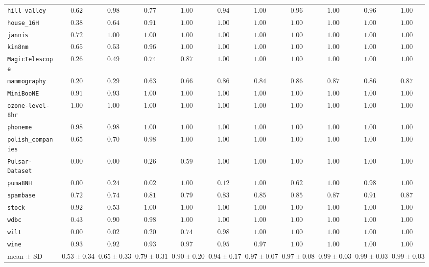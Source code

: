 {\begin{tabular}{@{}lcccccccccc@{}}
\texttt{hill-valley} & $0.62$ & $0.98$ & $0.77$ & $1.00$ & $0.94$ & $1.00$ & $0.96$ & $1.00$ & $0.96$ & $1.00$ \\
\texttt{house\_16H} & $0.38$ & $0.64$ & $0.91$ & $1.00$ & $1.00$ & $1.00$ & $1.00$ & $1.00$ & $1.00$ & $1.00$ \\
\texttt{jannis} & $0.72$ & $1.00$ & $1.00$ & $1.00$ & $1.00$ & $1.00$ & $1.00$ & $1.00$ & $1.00$ & $1.00$ \\
\texttt{kin8nm} & $0.65$ & $0.53$ & $0.96$ & $1.00$ & $1.00$ & $1.00$ & $1.00$ & $1.00$ & $1.00$ & $1.00$ \\
\texttt{MagicTelescope} & $0.26$ & $0.49$ & $0.74$ & $0.87$ & $1.00$ & $1.00$ & $1.00$ & $1.00$ & $1.00$ & $1.00$ \\
\texttt{mammography} & $0.20$ & $0.29$ & $0.63$ & $0.66$ & $0.86$ & $0.84$ & $0.86$ & $0.87$ & $0.86$ & $0.87$ \\
\texttt{MiniBooNE} & $0.91$ & $0.93$ & $1.00$ & $1.00$ & $1.00$ & $1.00$ & $1.00$ & $1.00$ & $1.00$ & $1.00$ \\
\texttt{ozone-level-8hr} & $1.00$ & $1.00$ & $1.00$ & $1.00$ & $1.00$ & $1.00$ & $1.00$ & $1.00$ & $1.00$ & $1.00$ \\
\texttt{phoneme} & $0.98$ & $0.98$ & $1.00$ & $1.00$ & $1.00$ & $1.00$ & $1.00$ & $1.00$ & $1.00$ & $1.00$ \\
\texttt{polish\_companies} & $0.65$ & $0.70$ & $0.98$ & $1.00$ & $1.00$ & $1.00$ & $1.00$ & $1.00$ & $1.00$ & $1.00$ \\
\texttt{Pulsar-Dataset} & $0.00$ & $0.00$ & $0.26$ & $0.59$ & $1.00$ & $1.00$ & $1.00$ & $1.00$ & $1.00$ & $1.00$ \\
\texttt{puma8NH} & $0.00$ & $0.24$ & $0.02$ & $1.00$ & $0.12$ & $1.00$ & $0.62$ & $1.00$ & $0.98$ & $1.00$ \\
\texttt{spambase} & $0.72$ & $0.74$ & $0.81$ & $0.79$ & $0.83$ & $0.85$ & $0.85$ & $0.87$ & $0.91$ & $0.87$ \\
\texttt{stock} & $0.92$ & $0.53$ & $1.00$ & $1.00$ & $1.00$ & $1.00$ & $1.00$ & $1.00$ & $1.00$ & $1.00$ \\
\texttt{wdbc} & $0.43$ & $0.90$ & $0.98$ & $1.00$ & $1.00$ & $1.00$ & $1.00$ & $1.00$ & $1.00$ & $1.00$ \\
\texttt{wilt} & $0.00$ & $0.02$ & $0.20$ & $0.74$ & $0.98$ & $1.00$ & $1.00$ & $1.00$ & $1.00$ & $1.00$ \\
\texttt{wine} & $0.93$ & $0.92$ & $0.93$ & $0.97$ & $0.95$ & $0.97$ & $1.00$ & $1.00$ & $1.00$ & $1.00$ \\
\midrule mean $\pm$ SD & $0.53 \pm 0.34$ & $0.65 \pm 0.33$ & $0.79 \pm 0.31$ & $0.90 \pm 0.20$ & $0.94 \pm 0.17$ & $0.97 \pm 0.07$ & $0.97 \pm 0.08$ & $0.99 \pm 0.03$ & $0.99 \pm 0.03$ & $0.99 \pm 0.03$ \\

\end{tabular}}
